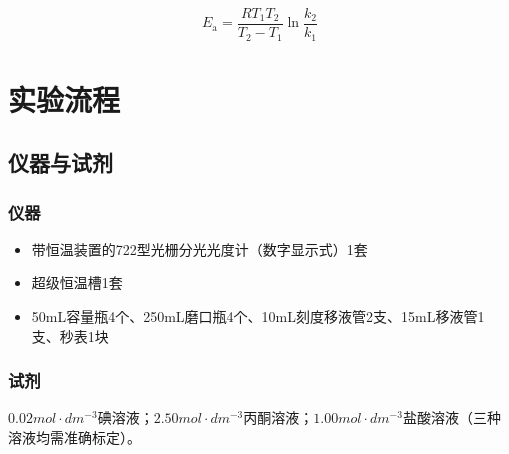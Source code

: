 \documentclass[hyperref,a4paper,UTF8]{ctexart}
\begin{document}
\begin{equation}
E_{\mathrm{a}}=\frac{R T_1 T_2}{T_2-T_1} \ln \frac{k_2}{k_1}
\end{equation}


\section{实验流程}
\subsection{仪器与试剂}
\subsubsection{仪器}
\begin{itemize}
   \item  带恒温装置的722型光栅分光光度计（数字显示式）1套
    \item 超级恒温槽1套
   \item 50mL容量瓶4个、250mL磨口瓶4个、10mL刻度移液管2支、15mL移液管1支、秒表1块
\end{itemize}
\subsubsection{试剂}
$0.02mol·dm^{-3}$碘溶液；$2.50mol·dm^{-3}$丙酮溶液；$1.00mol·dm^{-3}$盐酸溶液（三种溶液均需准确标定）。
\end{document}
